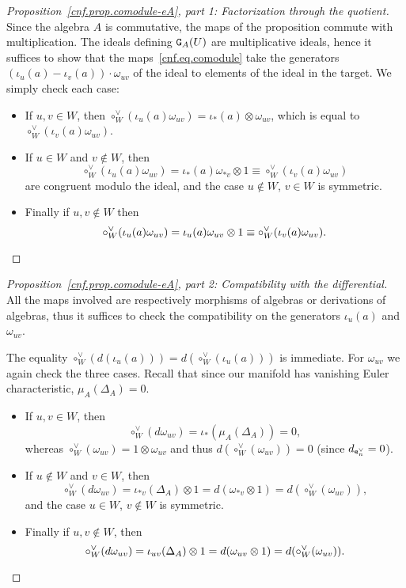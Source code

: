 \begin{proof}[Proposition~\ref{cnf.prop.comodule-eA}, part 1: Factorization through the quotient]
  Since the algebra $A$ is commutative, the maps of the proposition commute with multiplication.
The ideals defining $\mathtt{G}_{A}(U)$ are multiplicative ideals, hence it suffices to show that the maps~\eqref{cnf.eq.comodule} take the generators $(\iota_{u}(a) - \iota_{v}(a)) \cdot \omega_{uv}$ of the ideal to elements of the ideal in the target.
We simply check each case:
  \begin{itemize}
  \item If $u,v \in W$, then $\circ_{W}^{\vee}(\iota_{u}(a) \omega_{uv}) = \iota_{*}(a) \otimes \omega_{uv}$, which is equal to $\circ_{W}^{\vee}(\iota_{v}(a) \omega_{uv})$.
  \item If $u \in W$ and $v \not\in W$, then
    \[ \circ_{W}^{\vee}(\iota_{u}(a) \omega_{uv}) = \iota_{*}(a) \omega_{*v} \otimes 1 \equiv \circ_{W}^{\vee}(\iota_{v}(a) \omega_{uv}) \]
    are congruent modulo the ideal, and the case $u \not\in W$, $v \in W$ is symmetric.
  \item Finally if $u,v \not\in W$ then
    \[ \circ_{W}^{\vee}(\iota_{u}(a) \omega_{uv}) = \iota_{u}(a) \omega_{uv} \otimes 1 \equiv \circ_{W}^{\vee}(\iota_{v}(a) \omega_{uv}).
      \qedhere \]
  \end{itemize}
\end{proof}

\begin{proof}[Proposition~\ref{cnf.prop.comodule-eA}, part 2: Compatibility with the differential]
  All the maps involved are respectively morphisms of algebras or derivations of algebras, thus it suffices to check the compatibility on the generators $\iota_{u}(a)$ and $\omega_{uv}$.

  The equality $\circ_{W}^{\vee}(d(\iota_{u}(a))) = d(\circ_{W}^{\vee}(\iota_{u}(a)))$ is immediate.
  For $\omega_{uv}$ we again check the three cases.
  Recall that since our manifold has vanishing Euler characteristic, $\mu_{A}(\Delta_{A}) = 0$.
  \begin{itemize}
  \item If $u,v \in W$, then \[ \circ_{W}^{\vee}(d\omega_{uv}) = \iota_{*}(\mu_{A}(\Delta_{A})) = 0, \] whereas $\circ_{W}^{\vee}(\omega_{uv}) = 1 \otimes \omega_{uv}$ and thus $d(\circ_{W}^{\vee}(\omega_{uv})) = 0$ (since $d_{\mathtt{e}_{n}^{\vee}} = 0$).
  \item If $u \not\in W$ and $v \in W$, then
    \[ \circ_{W}^{\vee}(d \omega_{uv}) = \iota_{*v}(\Delta_{A}) \otimes 1 = d(\omega_{*v} \otimes 1) = d (\circ_{W}^{\vee}(\omega_{uv})), \]
    and the case $u \in W$, $v \not\in W$ is symmetric.
  \item Finally if $u,v \not\in W$, then
    \[ \circ_{W}^{\vee}(d \omega_{uv}) = \iota_{uv}(\Delta_{A}) \otimes 1 = d (\omega_{uv} \otimes 1) = d (\circ_{W}^{\vee}(\omega_{uv})).
      \qedhere \]
  \end{itemize}
\end{proof}

